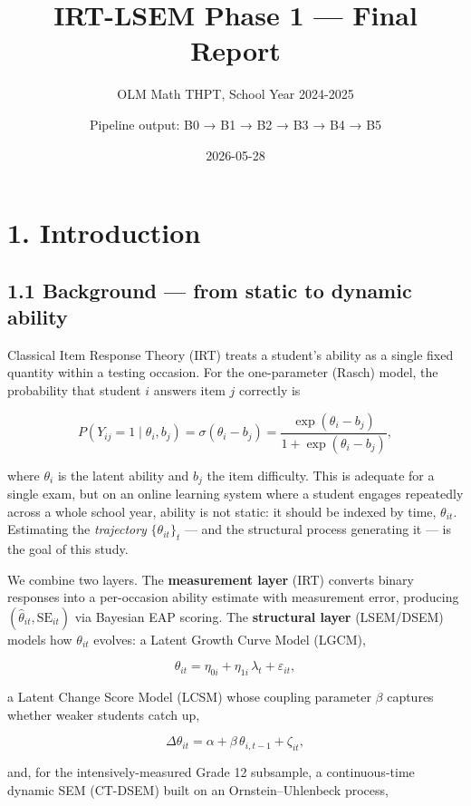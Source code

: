 \documentclass[
]{article}
\title{IRT-LSEM Phase 1 --- Final Report}
\subtitle{OLM Math THPT, School Year 2024-2025}
\author{Pipeline output: B0 → B1 → B2 → B3 → B4 → B5}
\date{2026-05-28}
\begin{document}
\maketitle

\hypertarget{introduction}{%
\section{1. Introduction}\label{introduction}}

\hypertarget{background-from-static-to-dynamic-ability}{%
\subsection{1.1 Background --- from static to dynamic
ability}\label{background-from-static-to-dynamic-ability}}

Classical Item Response Theory (IRT) treats a student's ability as a
single fixed quantity within a testing occasion. For the one-parameter
(Rasch) model, the probability that student \(i\) answers item \(j\)
correctly is

\[
P(Y_{ij} = 1 \mid \theta_i, b_j) = \sigma(\theta_i - b_j)
= \frac{\exp(\theta_i - b_j)}{1 + \exp(\theta_i - b_j)},
\]

where \(\theta_i\) is the latent ability and \(b_j\) the item
difficulty. This is adequate for a single exam, but on an online
learning system where a student engages repeatedly across a whole school
year, ability is not static: it should be indexed by time,
\(\theta_{it}\). Estimating the \emph{trajectory} \(\{\theta_{it}\}_t\)
--- and the structural process generating it --- is the goal of this
study.

We combine two layers. The \textbf{measurement layer} (IRT) converts
binary responses into a per-occasion ability estimate with measurement
error, producing \((\hat\theta_{it}, \mathrm{SE}_{it})\) via Bayesian
EAP scoring. The \textbf{structural layer} (LSEM/DSEM) models how
\(\theta_{it}\) evolves: a Latent Growth Curve Model (LGCM),

\[
\theta_{it} = \eta_{0i} + \eta_{1i}\,\lambda_t + \varepsilon_{it},
\]

a Latent Change Score Model (LCSM) whose coupling parameter \(\beta\)
captures whether weaker students catch up,

\[
\Delta\theta_{it} = \alpha + \beta\,\theta_{i,t-1} + \zeta_{it},
\]

and, for the intensively-measured Grade 12 subsample, a continuous-time
dynamic SEM (CT-DSEM) built on an Ornstein--Uhlenbeck process,
\end{document}
